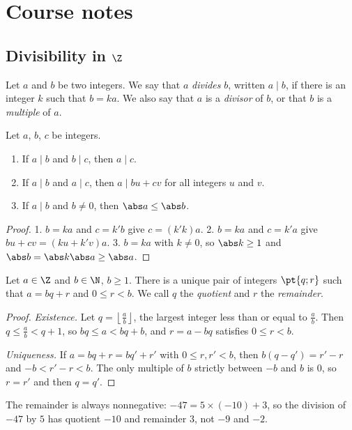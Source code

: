 \mxnewpage
\section{Course notes}
\subsection{Divisibility in $\Z$}
\begin{definition}
Let $a$ and $b$ be two integers. We say that $a$ \emph{divides} $b$, written $a\mid b$, if there is an integer $k$ such that $b=ka$. We also say that $a$ is a \emph{divisor} of $b$, or that $b$ is a \emph{multiple} of $a$.
\end{definition}
\begin{theorem}
Let $a$, $b$, $c$ be integers.
\begin{enumerate}
\item If $a\mid b$ and $b\mid c$, then $a\mid c$.
\item If $a\mid b$ and $a\mid c$, then $a\mid bu+cv$ for all integers $u$ and $v$.
\item If $a\mid b$ and $b\neq0$, then $\abs a\le\abs b$.
\end{enumerate}
\end{theorem}
\begin{proof}
1. $b=ka$ and $c=k'b$ give $c=(k'k)a$. 2. $b=ka$ and $c=k'a$ give $bu+cv=(ku+k'v)a$. 3. $b=ka$ with $k\neq0$, so $\abs k\ge1$ and $\abs b=\abs k\abs a\ge\abs a$.
\end{proof}
\begin{theorem}
Let $a\in\Z$ and $b\in\N$, $b\ge1$. There is a unique pair of integers $\pt{q;r}$ such that $a=bq+r$ and $0\le r<b$. We call $q$ the \emph{quotient} and $r$ the \emph{remainder}.
\end{theorem}
\begin{proof}
\emph{Existence.} Let $q=\left\lfloor\frac ab\right\rfloor$, the largest integer less than or equal to $\frac ab$. Then $q\le\frac ab<q+1$, so $bq\le a<bq+b$, and $r=a-bq$ satisfies $0\le r<b$.\par
\emph{Uniqueness.} If $a=bq+r=bq'+r'$ with $0\le r,r'<b$, then $b(q-q')=r'-r$ and $-b<r'-r<b$. The only multiple of $b$ strictly between $-b$ and $b$ is $0$, so $r=r'$ and then $q=q'$.
\end{proof}
\begin{pitfall}
The remainder is always nonnegative: $-47=5\times(-10)+3$, so the division of $-47$ by $5$ has quotient $-10$ and remainder $3$, not $-9$ and $-2$.
\end{pitfall}

